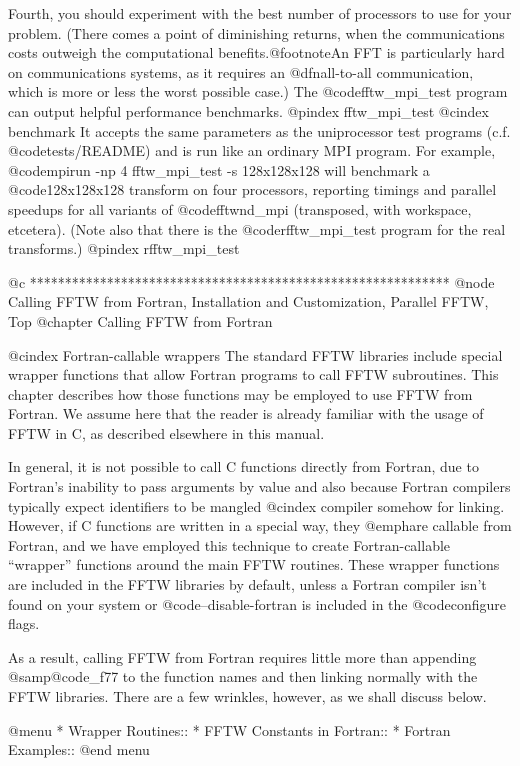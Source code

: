 Fourth, you should experiment with the best number of processors to use
for your problem.  (There comes a point of diminishing returns, when the
communications costs outweigh the computational benefits.@footnote{An
FFT is particularly hard on communications systems, as it requires an
@dfn{all-to-all} communication, which is more or less the worst possible
case.})  The @code{fftw_mpi_test} program can output helpful performance
benchmarks.
@pindex fftw_mpi_test
@cindex benchmark
It accepts the same parameters as the uniprocessor test programs
(c.f. @code{tests/README}) and is run like an ordinary MPI program.  For
example, @code{mpirun -np 4 fftw_mpi_test -s 128x128x128} will benchmark
a @code{128x128x128} transform on four processors, reporting timings and
parallel speedups for all variants of @code{fftwnd_mpi} (transposed,
with workspace, etcetera).  (Note also that there is the
@code{rfftw_mpi_test} program for the real transforms.)
@pindex rfftw_mpi_test


@c ************************************************************
@node Calling FFTW from Fortran, Installation and Customization, Parallel FFTW, Top
@chapter Calling FFTW from Fortran

@cindex Fortran-callable wrappers
The standard FFTW libraries include special wrapper functions that allow
Fortran programs to call FFTW subroutines.  This chapter describes how
those functions may be employed to use FFTW from Fortran.  We assume
here that the reader is already familiar with the usage of FFTW in C, as
described elsewhere in this manual.

In general, it is not possible to call C functions directly from
Fortran, due to Fortran's inability to pass arguments by value and also
because Fortran compilers typically expect identifiers to be mangled
@cindex compiler
somehow for linking.  However, if C functions are written in a special
way, they @emph{are} callable from Fortran, and we have employed this
technique to create Fortran-callable ``wrapper'' functions around the
main FFTW routines.  These wrapper functions are included in the FFTW
libraries by default, unless a Fortran compiler isn't found on your
system or @code{--disable-fortran} is included in the @code{configure}
flags.

As a result, calling FFTW from Fortran requires little more than
appending @samp{@code{_f77}} to the function names and then linking
normally with the FFTW libraries.  There are a few wrinkles, however, as
we shall discuss below.

@menu
* Wrapper Routines::            
* FFTW Constants in Fortran::   
* Fortran Examples::            
@end menu

